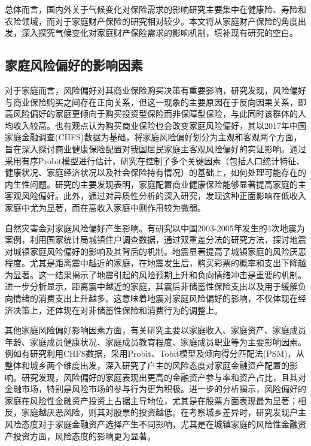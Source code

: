 总体而言，国内外关于气候变化对保险需求的影响研究主要集中在健康险、寿险和农险领域，而对于家庭财产保险的研究相对较少。本文将从家庭财产保险的角度出发，深入探究气候变化对家庭财产保险需求的影响机制，填补现有研究的空白。

\subsection{家庭风险偏好的影响因素}
对于家庭而言，风险偏好对其商业保险购买决策有重要影响，研究发现，风险偏好与商业保险购买之间存在正向关系\citep{宋章良2021我国中老年家庭风险偏好对商业保险购买行为的影响研究}，但这一现象的主要原因在于反向因果关系，即高风险偏好的家庭更倾向于购买投资型保险而非保障型保险，与此同时该群体的人均收入较高。也有观点认为购买商业保险也会改变家庭风险偏好\citep{孙武军2023商业健康保险的配置能够改变家庭的风险偏好吗}，其以2017年中国家庭金融调查(CHFS)数据为基础，将家庭风险偏好划分为主观和客观两个方面，旨在深入探讨商业健康保险配置对我国居民家庭主客观风险偏好的实证影响。通过采用有序Probit模型进行估计，研究在控制了多个关键因素（包括人口统计特征、健康状况、家庭经济状况以及社会保险持有情况）的基础上，如何处理可能存在的内生性问题。研究的主要发现表明，家庭配置商业健康保险能够显著提高家庭的主客观风险偏好。此外，通过对异质性分析的深入研究，发现这种正面影响在低收入家庭中尤为显著，而在高收入家庭中则作用较为微弱。

自然灾害会对家庭风险偏好产生影响。有研究以中国2003-2005年发生的4次地震为案例，利用国家统计局城镇住户调查数据，通过双重差分法的研究方法，探讨地震对城镇家庭风险偏好的影响及其背后的机制\citep{章元0地震冲击对风险偏好的影响}。地震显著提高了城镇家庭的风险厌恶程度。尤其是距离震中越近的家庭，在地震发生后，购买彩票的概率和支出下降越为显著。这一结果揭示了地震引起的风险预期上升和负向情绪冲击是重要的机制。进一步分析显示，距离震中越近的家庭，其震后非储蓄性保险支出以及用于缓解负向情绪的消费支出上升越多。这意味着地震对家庭风险偏好的影响，不仅体现在经济决策上，还体现在对非储蓄性保险和消费行为的调整上。

其他家庭风险偏好影响因素方面，有关研究主要以家庭收入、家庭资产、家庭成员年龄、家庭成员健康状况、家庭成员教育程度、家庭成员职业等为主要影响因素。例如有研究利用CHFS数据，采用Probit、Tobit模型及倾向得分匹配法(PSM)，从整体和城乡两个维度出发，深入研究了户主的风险态度对家庭金融资产配置的影响\citep{卢亚娟殷君瑶2021户主风险态度对家庭金融资产配置的影响研究}。研究发现，风险偏好的家庭表现出更高的金融资产参与率和资产占比，且其对金融市场，特别是风险市场的参与行为更为积极。进一步的分析揭示，风险偏好的家庭在风险性金融资产投资上占据主导地位，尤其是在股票方面表现最为显著；相反，家庭越厌恶风险，则其对股票的投资越低。在考察城乡差异时，研究发现户主风险态度对于家庭金融资产选择产生不同影响，尤其是在城镇家庭的风险性金融资产投资方面，风险态度的影响更为显著。

